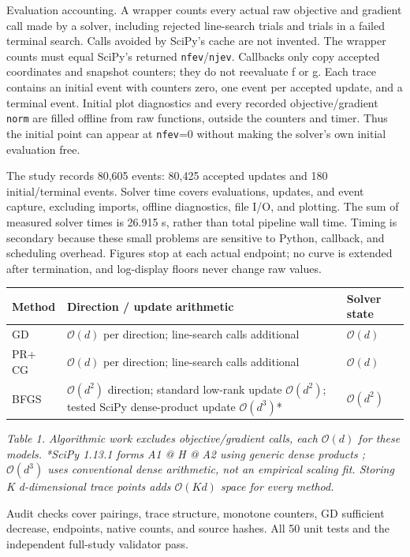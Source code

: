 \documentclass[10pt]{article}
\begin{document}
Evaluation accounting. A wrapper counts every actual raw objective and gradient call made by a solver, including rejected line-search trials and trials in a failed terminal search. Calls avoided by SciPy's cache are not invented. The wrapper counts must equal SciPy's returned \texttt{nfev}/\texttt{njev}. Callbacks only copy accepted coordinates and snapshot counters; they do not reevaluate f or g. Each trace contains an initial event with counters zero, one event per accepted update, and a terminal event. Initial plot diagnostics and every recorded objective/gradient \texttt{norm} are filled offline from raw functions, outside the counters and timer. Thus the initial point can appear at \texttt{nfev}=0 without making the solver's own initial evaluation free.

The study records 80,605 events: 80,425 accepted updates and 180 initial/terminal events. Solver time covers evaluations, updates, and event capture, excluding imports, offline diagnostics, file I/O, and plotting. The sum of measured solver times is 26.915 s, rather than total pipeline wall time. Timing is secondary because these small problems are sensitive to Python, callback, and scheduling overhead. Figures stop at each actual endpoint; no curve is extended after termination, and log-display floors never change raw values.

\begingroup
\fontsize{8}{9.2}\selectfont
\setlength{\tabcolsep}{3pt}
\renewcommand{\arraystretch}{1.05}
\centering
\begin{tabular}{@{}>{\raggedright\arraybackslash}p{}>{\raggedright\arraybackslash}p{}>{\raggedright\arraybackslash}p{}@{}}
\toprule
\textbf{Method} & \textbf{Direction / update arithmetic} & \textbf{Solver state} \\
\midrule
GD & \(\mathcal{O}(d)\) per direction; line-search calls additional & \(\mathcal{O}(d)\) \\
PR+ CG & \(\mathcal{O}(d)\) per direction; line-search calls additional & \(\mathcal{O}(d)\) \\
BFGS & \(\mathcal{O}(d^{2})\) direction; standard low-rank update \(\mathcal{O}(d^{2})\); tested SciPy dense-product update \(\mathcal{O}(d^{3})\)* & \(\mathcal{O}(d^{2})\) \\
\bottomrule
\end{tabular}\par
\endgroup
\smallskip
{\small\itshape Table 1. Algorithmic work excludes objective/gradient calls, each \(\mathcal{O}(d)\) for these models. *SciPy 1.13.1 forms A1 @ H @ A2 using generic dense products \cite{ref7}; \(\mathcal{O}(d^{3})\) uses conventional dense arithmetic, not an empirical scaling fit. Storing K d-dimensional trace points adds \(\mathcal{O}(Kd)\) space for every method.\par}\smallskip
Audit checks cover pairings, trace structure, monotone counters, GD sufficient decrease, endpoints, native counts, and source hashes. All 50 unit tests and the independent full-study validator pass.
\end{document}

